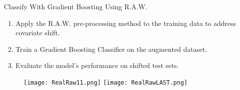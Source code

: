 \begin{frame}{Classify With Gradient Boosting Using R.A.W.}
    \begin{enumerate}
        \item  Apply the R.A.W. pre-processing method to the training data to address covariate shift.
        \item  Train a Gradient Boosting Classifier on the augmented dataset.
        \item  Evaluate the model's performance on shifted test sets.
    \end{enumerate}
    
    \vspace{1em}
    \begin{figure}
        \centering
        \texttt{[image: RealRaw11.png]}
        \hfill
        \texttt{[image: RealRawLAST.png]}
    \end{figure}
    
\end{frame}




